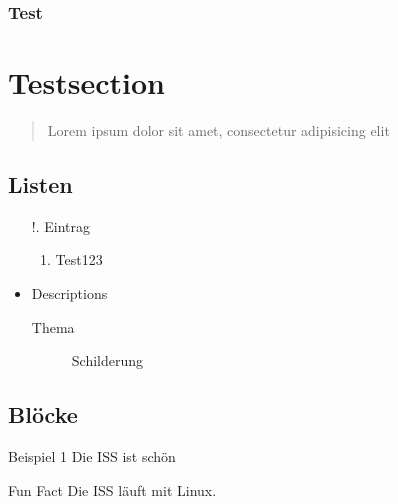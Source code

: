 
\begin{frame}
    \frametitle{Test}


    \section{Testsection}\label{sec:testsection}

    \begin{quote}
        Lorem ipsum dolor sit amet, consectetur adipisicing elit
    \end{quote}


    \subsection{Listen}\label{subsec:Listen}
    \begin{itemize}
        \item[!.] Eintrag
        \begin{enumerate}
            \item Test123
        \end{enumerate}
        \item Descriptions
        \begin{description}
            \item[Thema] Schilderung
        \end{description}
    \end{itemize}

    \subsection{Blöcke}\label{subsec:Blocke}
    \begin{exampleblock}{Beispiel 1}
        Die ISS ist schön
    \end{exampleblock}
    \begin{alertblock}{Fun Fact}
        Die ISS läuft mit Linux.
    \end{alertblock}

\end{frame}